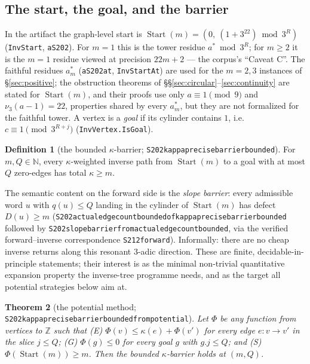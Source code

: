 \documentclass[11pt]{amsart}
\newtheorem{theorem}{Theorem}[section]
\theoremstyle{definition}
\newtheorem{definition}[theorem]{Definition}
\theoremstyle{remark}
\newcommand{\InvStart}{\operatorname{Start}}
\newcommand{\lean}[1]{{\def\_{\textunderscore\allowbreak}\texttt{#1}}}
\newcommand{\N}{\mathbb{N}}
\newcommand{\Z}{\mathbb{Z}}
\newcommand{\nuthree}{\nu_3}
\begin{document}
\subsection{The start, the goal, and the barrier}
In the artifact the graph-level start is
$\InvStart(m) = (0,\ (1+3^{22}) \bmod 3^{R})$ (\lean{InvStart},
\lean{aS202}).  For $m = 1$ this is the tower residue $a^{*} \bmod 3^{R}$;
for $m \ge 2$ it is the $m=1$ residue viewed at precision $22m+2$ --- the
corpus's ``Caveat C''.  The faithful residues $a^{*}_m$ (\lean{aS202\_at},
\lean{InvStartAt}) are used for the $m = 2, 3$ instances of
\S\ref{sec:positive}; the obstruction theorems of
\S\S\ref{sec:circular}--\ref{sec:continuity} are stated for $\InvStart(m)$,
and their proofs use only $a \equiv 1 \pmod 9$ and $\nuthree(a-1) = 22$,
properties shared by every $a^{*}_m$, but they are not formalized for the
faithful tower.  A vertex is a \emph{goal} if its cylinder contains $1$,
i.e.\ $c \equiv 1 \pmod{3^{R+j}}$ (\lean{InvVertex.IsGoal}).

\begin{definition}[the bounded $\kappa$-barrier; \lean{S202\_kappa\_precise\_barrier\_bounded}]
\label{def:barrier}
For $m, Q \in \N$, every $\kappa$-weighted inverse path from $\InvStart(m)$
to a goal with at most $Q$ zero-edges has total $\kappa \ge m$.
\end{definition}

The semantic content on the forward side is the \emph{slope barrier}: every
admissible word $u$ with $q(u) \le Q$ landing in the cylinder of
$\InvStart(m)$ has defect $D(u) \ge m$
(\lean{S202\_actual\_edge\_count\_bounded\_of\_kappa\_precise\_barrier\_bounded}
followed by \lean{S202\_slope\_barrier\_from\_actual\_edge\_count\_bounded},
via the verified forward--inverse correspondence \lean{S212\_forward}).
Informally: there are no cheap inverse returns along this resonant $3$-adic
direction.  These are finite, decidable-in-principle statements; their
interest is as the minimal non-trivial quantitative expansion property the
inverse-tree programme needs, and as the target all potential strategies
below aim at.

\begin{theorem}[the potential method; \lean{S202\_kappa\_precise\_barrier\_bounded\_from\_potential}]
\label{thm:potential-method}
Let $\Phi$ be any function from vertices to $\Z$ such that
\emph{(E)} $\Phi(v) \le \kappa(e) + \Phi(v')$ for every edge $e: v \to v'$ in
the slice $j \le Q$; \emph{(G)} $\Phi(g) \le 0$ for every goal $g$ with
$g.j \le Q$; and \emph{(S)} $\Phi(\InvStart(m)) \ge m$.  Then the bounded
$\kappa$-barrier holds at $(m,Q)$.
\end{theorem}
\end{document}
